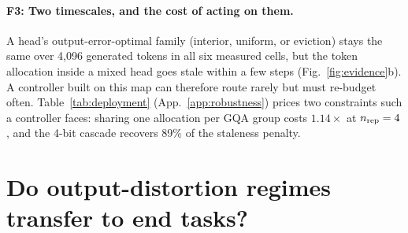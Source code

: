 \documentclass{article}
\theoremstyle{definition}
\begin{document}
\paragraph{F3: Two timescales, and the cost of acting on them.}
A head's output-error-optimal family (interior, uniform, or eviction) stays the same over 4,096 generated tokens in all six measured cells, but the token allocation inside a mixed head goes stale within a few steps (Fig.~\ref{fig:evidence}b).  A controller built on this map can therefore route rarely but must re-budget often.  Table~\ref{tab:deployment} (App.~\ref{app:robustness}) prices two constraints such a controller faces: sharing one allocation per GQA group costs $1.14\times$ at $n_{\rm rep}=4$, and the 4-bit cascade recovers 89\% of the staleness penalty.



\section{Do output-distortion regimes transfer to end tasks?}
\label{sec:endtask}
\end{document}
